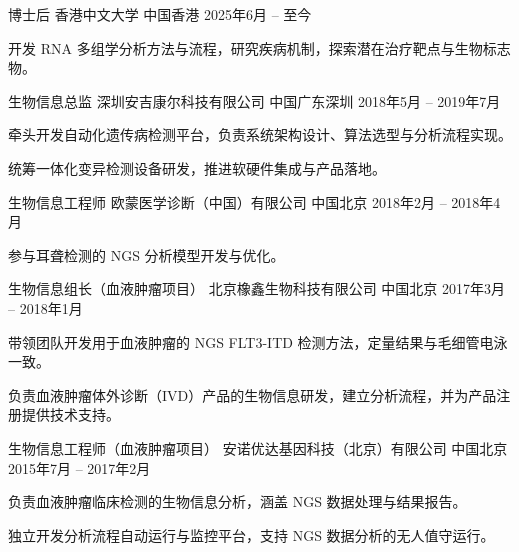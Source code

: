 
\begin{cventries}
  \cventry
    {博士后}
    {香港中文大学}
    {中国香港}
    {2025年6月 -- 至今}
    {
      \begin{cvitems}
        \item {开发 RNA 多组学分析方法与流程，研究疾病机制，探索潜在治疗靶点与生物标志物。}
      \end{cvitems}
    }

  \cventry
    {生物信息总监}
    {深圳安吉康尔科技有限公司}
    {中国广东深圳}
    {2018年5月 -- 2019年7月}
    {
      \begin{cvitems}
        \item {牵头开发自动化遗传病检测平台，负责系统架构设计、算法选型与分析流程实现。}
        \item {统筹一体化变异检测设备研发，推进软硬件集成与产品落地。}
      \end{cvitems}
    }

  \cventry
    {生物信息工程师}
    {欧蒙医学诊断（中国）有限公司}
    {中国北京}
    {2018年2月 -- 2018年4月}
    {
      \begin{cvitems}
        \item {参与耳聋检测的 NGS 分析模型开发与优化。}
      \end{cvitems}
    }

  \cventry
    {生物信息组长（血液肿瘤项目）}
    {北京橡鑫生物科技有限公司}
    {中国北京}
    {2017年3月 -- 2018年1月}
    {
      \begin{cvitems}
        \item {带领团队开发用于血液肿瘤的 NGS FLT3-ITD 检测方法，定量结果与毛细管电泳一致。}
        \item {负责血液肿瘤体外诊断（IVD）产品的生物信息研发，建立分析流程，并为产品注册提供技术支持。}
      \end{cvitems}
    }

  \cventry
    {生物信息工程师（血液肿瘤项目）}
    {安诺优达基因科技（北京）有限公司}
    {中国北京}
    {2015年7月 -- 2017年2月}
    {
      \begin{cvitems}
        \item {负责血液肿瘤临床检测的生物信息分析，涵盖 NGS 数据处理与结果报告。}
        \item {独立开发分析流程自动运行与监控平台，支持 NGS 数据分析的无人值守运行。}
      \end{cvitems}
    }
\end{cventries}

